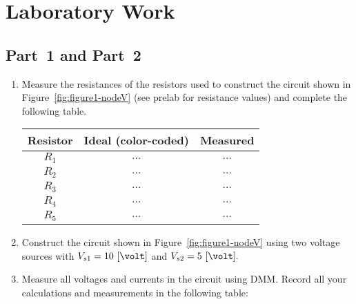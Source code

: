 
 


\section{Laboratory Work}
\subsection{Part~1 and Part~2}
\label{sec:part1}
\begin{enumerate}
\item Measure the resistances of the resistors used to construct the circuit shown in Figure~\ref{fig:figure1-nodeV} (see prelab for resistance values) and complete the following table.

\begin{center}
\begin{tabular}{c|c|c}
    \toprule
    Resistor &  Ideal (color-coded) & Measured\\
    \toprule
    $R_1$ & $\ldots$ & $\ldots$\\   %
    $R_2$ & $\ldots$ & $\ldots$\\   %
    $R_3$ & $\ldots$ & $\ldots$\\   %
    $R_4$ & $\ldots$ & $\ldots$\\   %
    $R_5$ & $\ldots$ & $\ldots$\\   %
    \bottomrule
  \end{tabular}    
\end{center}



\item Construct the circuit shown in Figure~\ref{fig:figure1-nodeV} using two voltage sources with $V_{s1} = 10~[\volt]$ and $V_{s2} = 5~[\volt].$ 
\item Measure all voltages and currents in the circuit using DMM. Record all your calculations and  measurements in the following table:


\end{enumerate}
